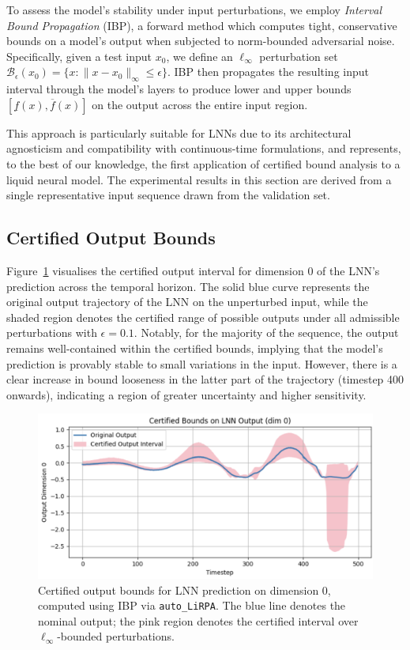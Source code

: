 To assess the model's stability under input perturbations, we employ \emph{Interval Bound Propagation} (IBP), a forward method which computes tight, conservative bounds on a model's output when subjected to norm-bounded adversarial noise. Specifically, given a test input \( x_0 \), we define an \(\ell_\infty\) perturbation set \( \mathcal{B}_\epsilon(x_0) = \{x : \|x - x_0\|_\infty \leq \epsilon\} \). IBP then propagates the resulting input interval through the model’s layers to produce lower and upper bounds \( [\underline{f}(x), \overline{f}(x)] \) on the output across the entire input region.

This approach is particularly suitable for LNNs due to its architectural agnosticism and compatibility with continuous-time formulations, and represents, to the best of our knowledge, the first application of certified bound analysis to a liquid neural model. The experimental results in this section are derived from a single representative input sequence drawn from the validation set.

\subsection*{Certified Output Bounds}

Figure~\ref{fig:lnn_ibp_bounds} visualises the certified output interval for dimension 0 of the LNN's prediction across the temporal horizon. The solid blue curve represents the original output trajectory of the LNN on the unperturbed input, while the shaded region denotes the certified range of possible outputs under all admissible perturbations with \( \epsilon = 0.1 \). Notably, for the majority of the sequence, the output remains well-contained within the certified bounds, implying that the model's prediction is provably stable to small variations in the input. However, there is a clear increase in bound looseness in the latter part of the trajectory (timestep 400 onwards), indicating a region of greater uncertainty and higher sensitivity.

\begin{figure}[H]
    \centering
    \includegraphics[width=0.9\linewidth]{img/auto_lirpa_lnn_certified_bounds.png}
    \caption{Certified output bounds for LNN prediction on dimension 0, computed using IBP via \texttt{auto\_LiRPA}. The blue line denotes the nominal output; the pink region denotes the certified interval over \( \ell_\infty \)-bounded perturbations.}
    \label{fig:lnn_ibp_bounds}
\end{figure}

